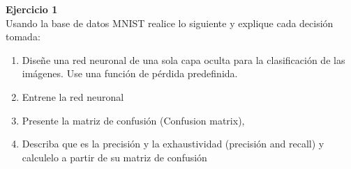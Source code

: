\documentclass[a4paper, 11pt]{article}
\newenvironment{problem}[2][Ejercicio]
{ \begin{mdframed}[backgroundcolor= red!50] \textbf{#1 #2} \\}
	{  \end{mdframed}}
\begin{document}
	\setlength{\parskip}{\medskipamount}
	\setlength{\parindent}{0pt}

\begin{problem}{1}
    Usando la base de datos MNIST realice lo siguiente y explique cada decisión tomada:
    \begin{enumerate}
        \item Diseñe una red neuronal de una sola capa oculta para la clasificación de las imágenes. Use una función de pérdida predefinida. 
        \item Entrene la red neuronal 
        \item Presente la matriz de confusión (Confusion matrix),
        \item Describa que es la precisión y la exhaustividad (precisión and recall) y calculelo a partir de su matriz de confusión 
    \end{enumerate}
\end{problem}
\end{document}
